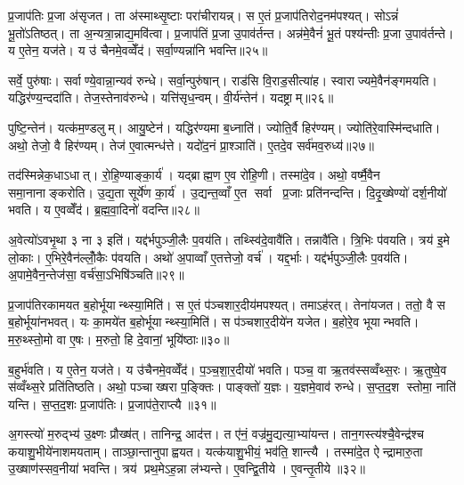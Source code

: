 प्र॒जाप॑तिः प्र॒जा अ॑सृजत। ता अ॑स्माथ्सृ॒ष्टाः परा॑चीरायन्न्। स ए॒तं प्र॒जाप॑तिरोद॒नम॑पश्यत्। सोऽन्नं॑ भू॒तो॑ऽतिष्ठत्। ता अ॒न्यत्रा॒न्नाद्य॒मवि॑त्वा। प्र॒जाप॑तिं प्र॒जा उ॒पाव॑र्तन्त। अन्न॑मे॒वैनं॑ भू॒तं पश्य॑न्तीः प्र॒जा उ॒पाव॑र्तन्ते। य ए॒तेन॒ यज॑ते। य उ॑ चैनमे॒वव्वेँद॑। सर्वा॒ण्यन्ना॑नि भवन्ति॥२५॥

सर्वे॒ पुरु॑षाः। सर्वाण्ये॒वान्ना॒न्यव॑ रुन्धे। सर्वा॒न्पुरु॑षान्। राड॑सि वि॒राड॒सीत्या॑ह। स्वाराज्यमे॒वैन॑ङ्गमयति। यद्धिर॑ण्य॒न्ददा॑ति। तेज॒स्तेनाव॑रुन्धे। यत्ति॑सृध॒न्वम्। वी॒र्य॑न्तेन॑। यदष्ट्राम्॥२६॥

पुष्टि॒न्तेन॑। यत्क॑म॒ण्डलुम्। आयु॒ष्टेन॑। यद्धिर॑ण्यमा ब॒ध्नाति॑। ज्योति॒र्वै हिर॑ण्यम्। ज्योति॑रे॒वास्मि॑न्दधाति। अथो॒ तेजो॒ वै हिर॑ण्यम्। तेज॑ ए॒वात्मन्ध॑त्ते। यदो॑द॒नं प्रा॒श्ञाति॑। ए॒तदे॒व सर्व॑मव॒रुध्य॑॥२७॥

तद॑स्मिन्नेक॒धाऽधात्। रो॒हि॒ण्याङ्का॒र्य॑। यद्ब्राह्म॒ण ए॒व रो॑हि॒णी। तस्मा॑दे॒व। अथो॒ वर्ष्मै॒वैन समा॒नानाङ्करोति। उ॒द्य॒ता सूर्ये॑ण का॒र्य॑। उ॒द्यन्त॒व्वाँ ए॒त सर्वा प्र॒जाः प्रति॑नन्दन्ति। दि॒दृ॒ख्षेण्यो॑ दर्\mbox{}श॒नीयो॑ भवति। य ए॒वव्वेँद॑। ब्र॒ह्म॒वा॒दिनो॑ वदन्ति॥२८॥

अ॒वेत्यो॑ऽवभृ॒था ३ ना ३ इति॑। यद्द॑र्भपुञ्जी॒लैः प॒वय॑ति। तथ्स्वि॑दे॒वावै॑ति। तन्नावै॑ति। त्रि॒भिः प॑वयति। त्रय॑ इ॒मे लो॒काः। ए॒भिरे॒वैन॑ल्लोँ॒कैः प॑वयति। अथो॑ अ॒पाव्वाँ ए॒तत्तेजो॒ वर्च॑। यद्द॒र्भाः। यद्द॑र्भपुञ्जी॒लैः प॒वय॑ति। अ॒पामे॒वैन॒न्तेज॑सा॒ वर्च॑सा॒ऽभिषि॑ञ्चति॥२९॥\anuvakamend[भ॒व॒न्त्यष्ट्रा॑मव॒रुध्य॑ वदन्ति द॒र्भा यद्द॑र्भपुञ्जी॒लैः प॒वय॒त्येक॑ञ्च]

प्र॒जाप॑तिरकामयत ब॒होर्भूयान्थ्स्या॒मिति॑। स ए॒तं प॑ञ्चशार॒दीय॑मपश्यत्। तमाऽह॑रत्। तेना॑यजत। ततो॒ वै स ब॒होर्भूया॑नभवत्। यः का॒मये॑त ब॒होर्भूयान्थ्स्या॒मिति॑। स प॑ञ्चशार॒दीये॑न यजेत। ब॒होरे॒व भूयान्भवति। म॒रु॒थ्स्तो॒मो वा ए॒षः। म॒रुतो॒ हि दे॒वानां॒ भूयि॑ष्ठाः॥३०॥

ब॒हुर्भ॑वति। य ए॒तेन॒ यज॑ते। य उ॑चैनमे॒वव्वेँद॑। प॒ञ्च॒शा॒र॒दीयो॑ भवति। पञ्च॒ वा ऋ॒तव॑स्सव्वँथ्स॒रः। ऋ॒तुष्वे॒व स॑व्वँथ्स॒रे प्रति॑तिष्ठति। अथो॒ पञ्चाख्षरा प॒ङ्क्तिः। पाङ्क्तो॑ य॒ज्ञः। य॒ज्ञमे॒वाव॑ रुन्धे। स॒प्त॒द॒श स्तोमा॒ नाति॑ यन्ति। स॒प्त॒द॒शः प्र॒जाप॑तिः। प्र॒जाप॑ते॒राप्त्यै॥३१॥\anuvakamend[भूयि॑ष्ठा यन्ति॒ द्वे च॑]

अ॒गस्त्यो॑ म॒रुद्भ्य॑ उ॒क्ष्णः प्रौख्ष॑त्। तानिन्द्र॒ आद॑त्त। त ए॑नं॒ वज्र॑मु॒द्यत्या॒भ्या॑यन्त। तान॒गस्त्य॑श्चै॒वेन्द्र॑श्च कयाशु॒भीये॑नाशमयताम्। ताञ्छा॒न्तानुपाह्वयत। यत्क॑याशु॒भीयं॒ भव॑ति॒ शान्त्यै। तस्मा॑दे॒त ऐन्द्रामारु॒ता उ॒ख्षाण॑स्सव॒नीया॑ भवन्ति। त्रय॑ प्रथ॒मेऽह॒न्ना ल॑भ्यन्ते। ए॒वन्द्वि॒तीये। ए॒वन्तृ॒तीये॥३२॥

